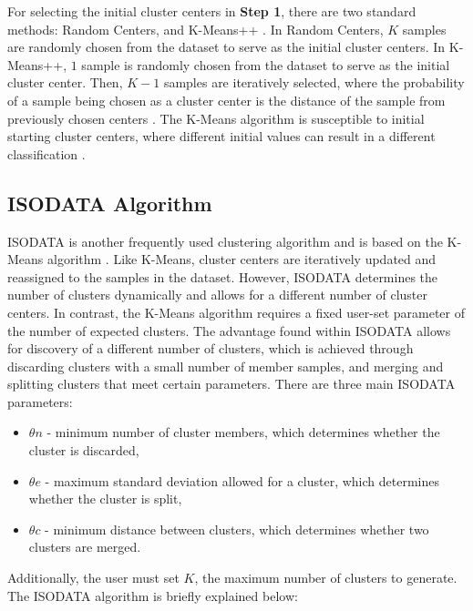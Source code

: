 \documentclass[a4paper, 10pt]{article}
\begin{document}
For selecting the initial cluster centers in \textbf{Step 1}, there are two
standard methods: Random Centers, and K-Means++ \cite{Arthur2007}. In Random
Centers, $K$ samples are randomly chosen from the dataset to serve as the
initial cluster centers. In K-Means++, $1$ sample is randomly chosen from the
dataset to serve as the initial cluster center. Then, $K-1$ samples are
iteratively selected, where the probability of a sample being chosen as a
cluster center is the distance of the sample from previously chosen centers
\cite{Arthur2007}. The K-Means algorithm is susceptible to initial starting
cluster centers, where different initial values can result in a different
classification \cite{Franti2018}.



\subsection{ISODATA Algorithm}

ISODATA is another frequently used clustering algorithm and is based on the
K-Means algorithm \cite{Ball1965}. Like K-Means, cluster centers are iteratively updated and
reassigned to the samples in the dataset. However, ISODATA determines the number
of clusters dynamically and allows for a different number of cluster centers. In
contrast, the K-Means algorithm requires a fixed user-set parameter of the
number of expected clusters. The advantage found within ISODATA allows for
discovery of a different number of clusters, which is achieved through
discarding clusters with a small number of member samples, and merging and
splitting clusters that meet certain parameters. There are three main ISODATA
parameters:

\begin{itemize}
      \item $\theta n$ - minimum number of cluster members, which determines
            whether the cluster is discarded,
      \item $\theta e$ - maximum standard deviation allowed for a cluster, which
            determines whether the cluster is split,
      \item $\theta c$ - minimum distance between clusters, which determines
            whether two clusters are merged.
\end{itemize}

Additionally, the user must set $K$, the maximum number of clusters to generate.
The ISODATA algorithm is briefly explained below:
\end{document}
